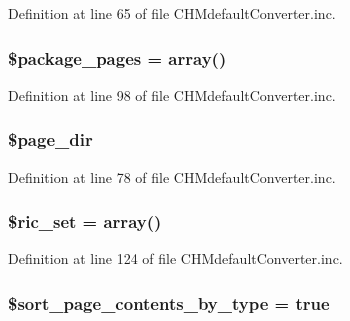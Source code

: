 \-Definition at line 65 of file \-C\-H\-Mdefault\-Converter.\-inc.

\hypertarget{class_c_h_mdefault_converter_acb916db0304b969918dbc0de762d45e0}{
\subsubsection[{\$package\-\_\-pages}]{\setlength{\rightskip}{0pt plus 5cm}\$package\-\_\-pages = array()}}\label{class_c_h_mdefault_converter_acb916db0304b969918dbc0de762d45e0}


\-Definition at line 98 of file \-C\-H\-Mdefault\-Converter.\-inc.

\hypertarget{class_c_h_mdefault_converter_ab554c658003c5e2653580ba881cd50eb}{
\subsubsection[{\$page\-\_\-dir}]{\setlength{\rightskip}{0pt plus 5cm}\$page\-\_\-dir}}\label{class_c_h_mdefault_converter_ab554c658003c5e2653580ba881cd50eb}


\-Definition at line 78 of file \-C\-H\-Mdefault\-Converter.\-inc.

\hypertarget{class_c_h_mdefault_converter_a84e3c5e32f1d02114c9d126d5864d06b}{
\subsubsection[{\$ric\-\_\-set}]{\setlength{\rightskip}{0pt plus 5cm}\$ric\-\_\-set = array()}}\label{class_c_h_mdefault_converter_a84e3c5e32f1d02114c9d126d5864d06b}


\-Definition at line 124 of file \-C\-H\-Mdefault\-Converter.\-inc.

\hypertarget{class_c_h_mdefault_converter_ab5dae87e1968b35e37687a763216a835}{
\subsubsection[{\$sort\-\_\-page\-\_\-contents\-\_\-by\-\_\-type}]{\setlength{\rightskip}{0pt plus 5cm}\$sort\-\_\-page\-\_\-contents\-\_\-by\-\_\-type = true}}\label{class_c_h_mdefault_converter_ab5dae87e1968b35e37687a763216a835}


